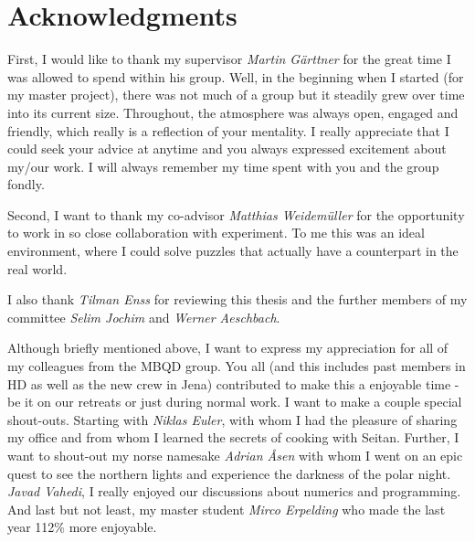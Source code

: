 
\bigskip

\begingroup
\let\clearpage\relax
\let\cleardoublepage\relax
\let\cleardoublepage\relax
\chapter*{Acknowledgments}
First, I would like to thank my supervisor \emph{Martin Gärttner} for the great time I was allowed to spend within his group. Well, in the beginning when I started (for my master project), there was not much of a group but it steadily grew over time into its current size. Throughout, the atmosphere was always open, engaged and friendly, which really is a reflection of your mentality. I really appreciate that I could seek your advice at anytime and you always expressed excitement about my/our work. I will always remember my time spent with you and the group fondly.

Second, I want to thank my co-advisor \emph{Matthias Weidemüller} for the opportunity to work in so close collaboration with experiment. To me this was an ideal environment, where I could solve puzzles that actually have a counterpart in the real world. %

I also thank \emph{Tilman Enss} for reviewing this thesis and the further members of my committee \emph{Selim Jochim} and \emph{Werner Aeschbach}.

Although briefly mentioned above, I want to express my appreciation for all of my colleagues from the MBQD group. You all (and this includes past members in HD as well as the new crew in Jena) contributed to make this a enjoyable time - be it on our retreats or just during normal work.
I want to make a couple special shout-outs. Starting with \emph{Niklas Euler}, with whom I had the pleasure of sharing my office and from whom I learned the secrets of cooking with Seitan. Further, I want to shout-out my norse namesake \emph{Adrian \AA sen} with whom I went on an epic quest to see the northern lights and experience the darkness of the polar night. \emph{Javad Vahedi}, I really enjoyed our discussions about numerics and programming. And last but not least, my master student \emph{Mirco Erpelding} who made the last year 112\% more enjoyable.

